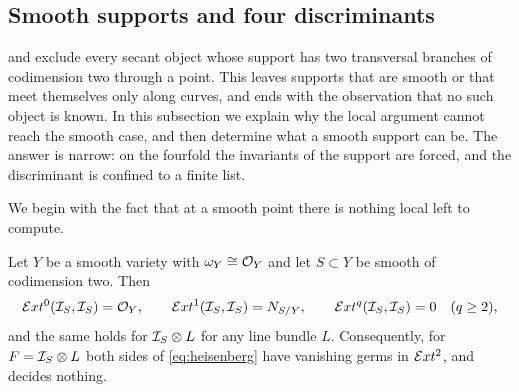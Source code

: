 \subsection{Smooth supports and four discriminants}
\label{ssec:smoothsupport}

 and  exclude every secant
object whose support has two transversal branches of codimension two
through a point. This leaves supports that are smooth or that meet
themselves only along curves, and  ends with the
observation that no such object is known. In this subsection we explain why
the local argument cannot reach the smooth case, and then determine what a
smooth support can be. The answer is narrow: on the fourfold the invariants
of the support are forced, and the discriminant is confined to a finite list.

We begin with the fact that at a smooth point there is nothing local left to
compute.

\begin{proposition}\label{prop:smoothlocal}
Let $Y$ be a smooth variety with $\omega_{Y}\cong\mathcal{O}_{Y}$ and let $S\subset Y$
be smooth of codimension two. Then
\[
  \mathcal{E} xt^{0}(\mathcal{I}_{S},\mathcal{I}_{S})=\mathcal{O}_{Y},\qquad
  \mathcal{E} xt^{1}(\mathcal{I}_{S},\mathcal{I}_{S})=N_{S/Y},\qquad
  \mathcal{E} xt^{q}(\mathcal{I}_{S},\mathcal{I}_{S})=0\quad(q\ge2),
\]
and the same holds for $\mathcal{I}_{S}\otimes L$ for any line bundle $L$.
Consequently, for $F=\mathcal{I}_{S}\otimes L$ both sides of \eqref{eq:heisenberg}
have vanishing germs in $\mathcal{E} xt^{2}$, and  decides nothing.
\end{proposition}

